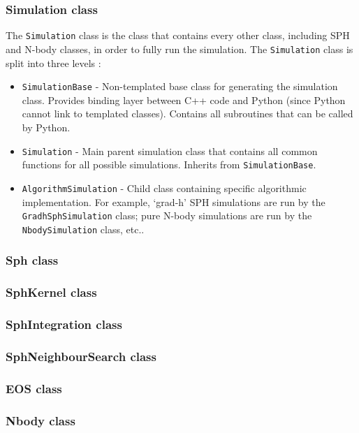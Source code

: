 \documentclass[a4paper]{article}
\newcommand{\var}[1]{\texttt{#1}}
\begin{document}
\subsubsection{Simulation class}
The \var{Simulation} class is the class that contains every other class, including SPH and N-body classes, in order to fully run the simulation.  The \var{Simulation} class is split into three levels :
\begin{itemize}
\item \var{SimulationBase} - Non-templated base class for generating the simulation class.  Provides binding layer between C++ code and Python (since Python cannot link to templated classes).  Contains all subroutines that can be called by Python.
\item \var{Simulation} - Main parent simulation class that contains all common functions for all possible simulations.  Inherits from \var{SimulationBase}.
\item \var{AlgorithmSimulation} - Child class containing specific algorithmic implementation.  For example, `grad-h' SPH simulations are run by the \var{GradhSphSimulation} class; pure N-body simulations are run by the \var{NbodySimulation} class, etc..
\end{itemize}

\subsubsection{Sph class}

\subsubsection{SphKernel class}

\subsubsection{SphIntegration class}

\subsubsection{SphNeighbourSearch class}

\subsubsection{EOS class}

\subsubsection{Nbody class}
\end{document}

